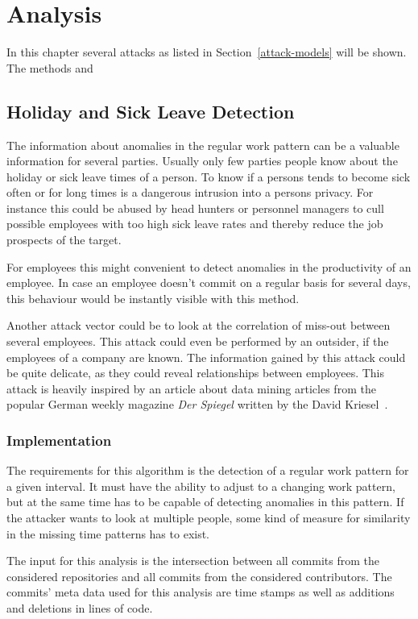 \chapter{Analysis}\label{analysis}
In this chapter several attacks as listed in Section~\ref{attack-models} will be shown. The methods and

\section{Holiday and Sick Leave Detection}

The information about anomalies in the regular work pattern can be a valuable information for several parties.
Usually only few parties people know about the holiday or sick leave times of a person.
To know if a persons tends to become sick often or for long times is a dangerous intrusion into a persons privacy.
For instance this could be abused by head hunters or personnel managers to cull possible employees with too high sick leave rates and thereby reduce the job prospects of the target.

For employees this might convenient to detect anomalies in the productivity of an employee.
In case an employee doesn't commit on a regular basis for several days, this behaviour would be instantly visible with this method.

Another attack vector could be to look at the correlation of miss-out between several employees.
This attack could even be performed by an outsider, if the employees of a company are known.
The information gained by this attack could be quite delicate, as they could reveal relationships between employees.
This attack is heavily inspired by an article about data mining articles from the popular German weekly magazine \emph{Der Spiegel} written by the David Kriesel~\cite{article:spiegel-mining}.


\subsection{Implementation}

The requirements for this algorithm is the detection of a regular work pattern for a given interval.
It must have the ability to adjust to a changing work pattern, but at the same time has to be capable of detecting anomalies in this pattern.
If the attacker wants to look at multiple people, some kind of measure for similarity in the missing time patterns has to exist.

The input for this analysis is the intersection between all commits from the considered repositories and all commits from the considered contributors.
The commits' meta data used for this analysis are time stamps as well as additions and deletions in lines of code.

